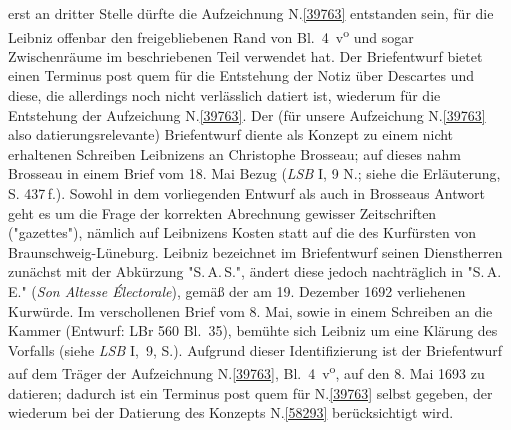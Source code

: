 \begin{ledgroup}
erst an dritter Stelle dürfte die Aufzeichnung N.\;\ref{39763} entstanden sein, für die Leibniz offenbar den freigebliebenen Rand von Bl.~4~v\textsuperscript{o} und sogar Zwischenräume im beschriebenen Teil verwendet hat.
Der Briefentwurf bietet einen Terminus post quem für die Entstehung der Notiz über Descartes und diese, die allerdings noch nicht verlässlich datiert ist, wiederum für die Entstehung der Aufzeichung N.\;\ref{39763}.
Der (für unsere Aufzeichung N.\;\ref{39763} also datierungsrelevante) Briefentwurf diente als Konzept zu einem nicht erhaltenen Schreiben Leibnizens an
Christophe Brosseau; auf dieses nahm Brosseau in einem \cite{02148}Brief vom 18. Mai Bezug (\textit{LSB} I, 9 N.; siehe die Erläuterung, S. 437\,f.).
Sowohl in dem vorliegenden Entwurf als auch in Brosseaus Antwort geht es um die Frage der korrekten Abrechnung gewisser Zeitschriften ("gazettes"), nämlich auf Leibnizens Kosten statt auf die des 
Kurfürsten von Braunschweig-Lüneburg. 
Leibniz bezeichnet im Briefentwurf seinen Dienstherren zunächst mit der Abkürzung "S.\,A.\,S.", ändert diese jedoch nachträglich in "S.\,A.\,E." (\textit{Son Altesse Électorale}), gemäß der am 19. Dezember 1692 verliehenen Kurwürde.
Im verschollenen Brief vom 8. Mai, sowie in einem Schreiben an die Kammer (Entwurf: LBr 560 Bl.~35), bemühte sich Leibniz um eine Klärung des Vorfalls (siehe \textit{LSB} I,~9, S.). 
Aufgrund dieser Identifizierung ist der Briefentwurf auf dem Träger der Aufzeichnung N.\;\ref{39763}, Bl.~4~v\textsuperscript{o}, auf den 8. Mai 1693 zu datieren; dadurch ist ein Terminus post quem für N.\;\ref{39763} selbst gegeben, der wiederum bei der Datierung des Konzepts N.\;\ref{58293} berücksichtigt wird. 
\pend
\end{ledgroup}
